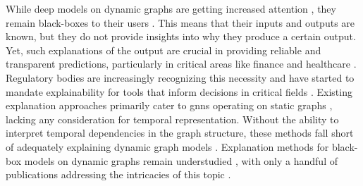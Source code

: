 While deep models on dynamic graphs are getting increased attention \cite{longa_graph_2023}, they remain black-boxes to their users \cite{vu_limit_2022}. This means that their inputs and outputs are known, but they do not provide insights into why they produce a certain output. Yet, such explanations of the output are crucial in providing reliable and transparent predictions, particularly in critical areas like finance and healthcare \cite{prado-romero_survey_2023}. Regulatory bodies are increasingly recognizing this necessity and have started to mandate explainability for tools that inform decisions in critical fields \cite{european_parliament_proposal_2021}. Existing explanation approaches primarily cater to \glspl{gnn} operating on static graphs \cite{yuan_explainability_2020, kakkad_survey_2023}, lacking any consideration for temporal representation. Without the ability to interpret temporal dependencies in the graph structure, these methods fall short of adequately explaining dynamic graph models \cite{he_explainer_2022, xia_explaining_2023, liu_differential_2023}. Explanation methods for black-box models on dynamic graphs remain understudied \cite{vu_limit_2022, longa_graph_2023}, with only a handful of publications addressing the intricacies of this topic \cite{he_explainer_2022, xia_explaining_2023, xie_explaining_2022, liu_differential_2023, fan_gcn-se_2021}.

